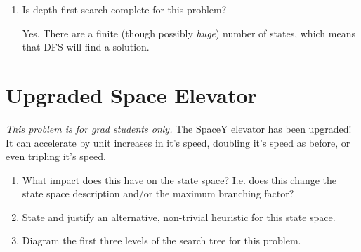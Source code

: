 \documentclass[12pt]{article}
\begin{document}
\begin{enumerate}
\item Is depth-first search complete for this problem?
\begin{solution}
Yes. There are a finite (though possibly \textit{huge}) number of states, which means that DFS will find a solution.
\end{solution}

\end{enumerate}

\newpage

\section{Upgraded Space Elevator}
\emph{This problem is for grad students only.} The SpaceY elevator has been upgraded! It can accelerate by unit increases in it's speed, doubling it's speed as before, or even tripling it's speed.

\begin{enumerate}
\item What impact does this have on the state space? I.e. does this change the state space description and/or the maximum branching factor?

\item State and justify an alternative, non-trivial heuristic for this state space.

\item Diagram the first three levels of the search tree for this problem.

\end{enumerate}
\end{document}
